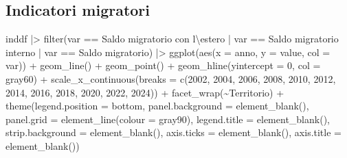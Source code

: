 \documentclass[
]{article}
\newenvironment{Shaded}{\begin{snugshade}}{\end{snugshade}}
\newcommand{\AttributeTok}[1]{\textcolor[rgb]{0.40,0.45,0.13}{#1}}
\newcommand{\DecValTok}[1]{\textcolor[rgb]{0.68,0.00,0.00}{#1}}
\newcommand{\FunctionTok}[1]{\textcolor[rgb]{0.28,0.35,0.67}{#1}}
\newcommand{\NormalTok}[1]{\textcolor[rgb]{0.00,0.23,0.31}{#1}}
\newcommand{\SpecialCharTok}[1]{\textcolor[rgb]{0.37,0.37,0.37}{#1}}
\newcommand{\StringTok}[1]{\textcolor[rgb]{0.13,0.47,0.30}{#1}}
\begin{document}
\subsection{Indicatori migratori}\label{indicatori-migratori}

\begin{Shaded}
\begin{Highlighting}[]
\NormalTok{inddf }\SpecialCharTok{|\textgreater{}} 
  \FunctionTok{filter}\NormalTok{(var }\SpecialCharTok{==} \StringTok{\textquotesingle{}Saldo migratorio con l}\SpecialCharTok{\textbackslash{}\textquotesingle{}}\StringTok{estero\textquotesingle{}} \SpecialCharTok{|}\NormalTok{ var }\SpecialCharTok{==} \StringTok{\textquotesingle{}Saldo migratorio interno\textquotesingle{}} \SpecialCharTok{|}\NormalTok{ var }\SpecialCharTok{==} \StringTok{\textquotesingle{}Saldo migratorio\textquotesingle{}}\NormalTok{) }\SpecialCharTok{|\textgreater{}} 
  \FunctionTok{ggplot}\NormalTok{(}\FunctionTok{aes}\NormalTok{(}\AttributeTok{x =}\NormalTok{ anno, }\AttributeTok{y =}\NormalTok{ value, }\AttributeTok{col =}\NormalTok{ var)) }\SpecialCharTok{+}
  \FunctionTok{geom\_line}\NormalTok{() }\SpecialCharTok{+}
  \FunctionTok{geom\_point}\NormalTok{() }\SpecialCharTok{+}
  \FunctionTok{geom\_hline}\NormalTok{(}\AttributeTok{yintercept =} \DecValTok{0}\NormalTok{, }\AttributeTok{col =} \StringTok{\textquotesingle{}gray60\textquotesingle{}}\NormalTok{) }\SpecialCharTok{+}
  \FunctionTok{scale\_x\_continuous}\NormalTok{(}\AttributeTok{breaks =} \FunctionTok{c}\NormalTok{(}\DecValTok{2002}\NormalTok{, }\DecValTok{2004}\NormalTok{, }\DecValTok{2006}\NormalTok{, }\DecValTok{2008}\NormalTok{, }\DecValTok{2010}\NormalTok{, }\DecValTok{2012}\NormalTok{, }\DecValTok{2014}\NormalTok{, }\DecValTok{2016}\NormalTok{, }\DecValTok{2018}\NormalTok{, }\DecValTok{2020}\NormalTok{, }\DecValTok{2022}\NormalTok{, }\DecValTok{2024}\NormalTok{)) }\SpecialCharTok{+}
  \FunctionTok{facet\_wrap}\NormalTok{(}\SpecialCharTok{\textasciitilde{}}\NormalTok{Territorio) }\SpecialCharTok{+}
  \FunctionTok{theme}\NormalTok{(}\AttributeTok{legend.position =} \StringTok{\textquotesingle{}bottom\textquotesingle{}}\NormalTok{,}
        \AttributeTok{panel.background =} \FunctionTok{element\_blank}\NormalTok{(),}
        \AttributeTok{panel.grid =} \FunctionTok{element\_line}\NormalTok{(}\AttributeTok{colour =} \StringTok{\textquotesingle{}gray90\textquotesingle{}}\NormalTok{),}
        \AttributeTok{legend.title =} \FunctionTok{element\_blank}\NormalTok{(),}
        \AttributeTok{strip.background =} \FunctionTok{element\_blank}\NormalTok{(),}
        \AttributeTok{axis.ticks =} \FunctionTok{element\_blank}\NormalTok{(),}
        \AttributeTok{axis.title =} \FunctionTok{element\_blank}\NormalTok{())}
\end{Highlighting}
\end{Shaded}
\end{document}
